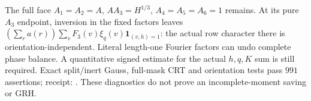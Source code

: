 The full face $A_1=A_2=A$, $AA_3=H^{1/3}$, $A_4=A_5=A_6=1$ remains.
At its pure $A_3$ endpoint, inversion in the fixed factors leaves
$(\sum_ra(r))\sum_vF_3(v)\xi_q(v)\mathbf1_{(v,h)=1}$:
the actual row character there is orientation-independent. Literal
length-one Fourier factors can undo complete phase balance.
A quantitative signed estimate for the actual $h,q,K$ sum is still
required. Exact split/inert Gauss, full-mask CRT and orientation tests
pass $991$ assertions; receipt:
.
These diagnostics do not prove an incomplete-moment saving or GRH.
